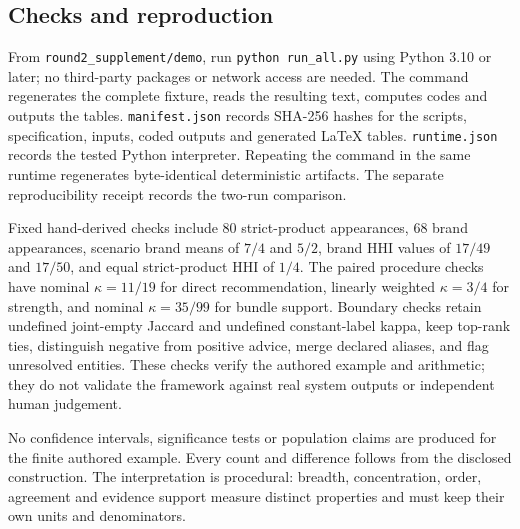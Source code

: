 \subsection{Checks and reproduction}
From \texttt{round2\_supplement/demo}, run \texttt{python run\_all.py} using Python 3.10 or later; no third-party packages or network access are needed. The command regenerates the complete fixture, reads the resulting text, computes codes and outputs the tables. \texttt{manifest.json} records SHA-256 hashes for the scripts, specification, inputs, coded outputs and generated LaTeX tables. \texttt{runtime.json} records the tested Python interpreter. Repeating the command in the same runtime regenerates byte-identical deterministic artifacts. The separate reproducibility receipt records the two-run comparison.

Fixed hand-derived checks include 80 strict-product appearances, 68 brand appearances, scenario brand means of $7/4$ and $5/2$, brand HHI values of $17/49$ and $17/50$, and equal strict-product HHI of $1/4$. The paired procedure checks have nominal $\kappa=11/19$ for direct recommendation, linearly weighted $\kappa=3/4$ for strength, and nominal $\kappa=35/99$ for bundle support. Boundary checks retain undefined joint-empty Jaccard and undefined constant-label kappa, keep top-rank ties, distinguish negative from positive advice, merge declared aliases, and flag unresolved entities. These checks verify the authored example and arithmetic; they do not validate the framework against real system outputs or independent human judgement.

No confidence intervals, significance tests or population claims are produced for the finite authored example. Every count and difference follows from the disclosed construction. The interpretation is procedural: breadth, concentration, order, agreement and evidence support measure distinct properties and must keep their own units and denominators.
